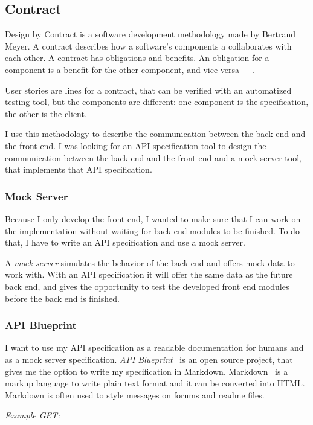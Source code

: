 \subsection{Contract}
Design by Contract is a software development methodology made by Bertrand Meyer. A contract describes how a software's components a collaborates with each other. A contract has obligations and benefits. An obligation for a component is a benefit for the other component, and vice versa~\cite{touch-of-class}~\cite{Szepes-onlab}~\cite{szofttech}.

User stories are lines for a contract, that can be verified with an automatized testing tool, but the components are different: one component is the specification, the other is the client.

I use this methodology to describe the communication between the back end and the front end. I was looking for an API specification tool to design the communication between the back end and the front end and a mock server tool, that implements that API specification.


\subsubsection{Mock Server}
Because I only develop the front end, I wanted to make sure that I can work on the implementation without waiting for back end modules to be finished. To do that, I have to write an API specification and use a mock server. 

A \emph{mock server} simulates the behavior of the back end and offers mock data to work with. With an API specification it will offer the same data as the future back end, and gives the opportunity to test the developed front end modules before the back end is finished.

\subsubsection{API Blueprint}
\label{api-blueprint}

I want to use my API specification as a readable documentation for humans and as a mock server specification. \emph{API Blueprint}~\cite{api-blueprint} is an open source project, that gives me the option to write my specification in Markdown. Markdown~\cite{markdown} is a markup language to write plain text format and it can be converted into HTML. Markdown is often used to style messages on forums and readme files. 

\emph{Example GET:}

